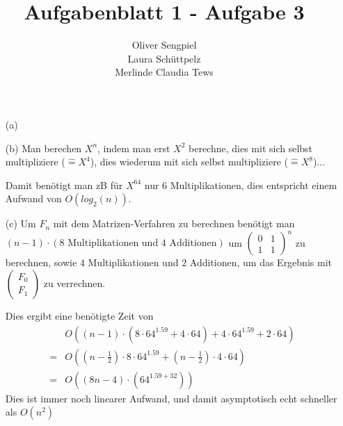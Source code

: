 \documentclass{article}
\title{Aufgabenblatt 1 - Aufgabe 3}
\author{Oliver Sengpiel \\
        Laura Schüttpelz \\
        Merlinde Claudia Tews}
\begin{document}
\maketitle

\begin{enumerate}
\item[(a)]

\item[(b)]
Man berechen $X^n$, indem man erst $X^2$ berechne, dies mit sich 
selbst multipliziere ($\widehat{=} X^4$), dies wiederum mit sich 
selbst multipliziere ($\widehat{=} X^8$)... 

Damit benötigt man zB für $X^{64}$ nur 6 Multiplikationen, 
dies entspricht einem Aufwand von $O(log_2(n))$.

\item[(c)]
Um $F_n$ mit dem Matrizen-Verfahren zu berechnen benötigt man 
$(n-1) \cdot (8 \text{ Multiplikationen und } 4 \text{ Additionen})$ 
um $\begin{pmatrix} 0 & 1 \\ 1 & 1 \end{pmatrix}^n$ zu berechnen, 
sowie $4$ Multiplikationen und $2$ Additionen, um das Ergebnis mit 
$\begin{pmatrix} F_0 \\ F_1 \end{pmatrix}$ zu verrechnen. 

Dies ergibt eine benötigte Zeit von 
\begin{align*}
&O((n-1) \cdot (8 \cdot 
64^{1.59} + 4 \cdot 64)+ 4 \cdot 64^{1.59} + 2 \cdot 64) \\ = 
&O((n-\frac{1}{2}) \cdot 8 \cdot 64^{1.59} + (n-\frac{1}{2})\cdot 4 \cdot 64) \\ 
= &O((8n-4)\cdot (64^{1.59 + 32}))
\end{align*}  
Dies ist immer noch linearer Aufwand, und damit asymptotisch 
echt schneller als $O(n^2)$
\end{enumerate}
\end{document}
